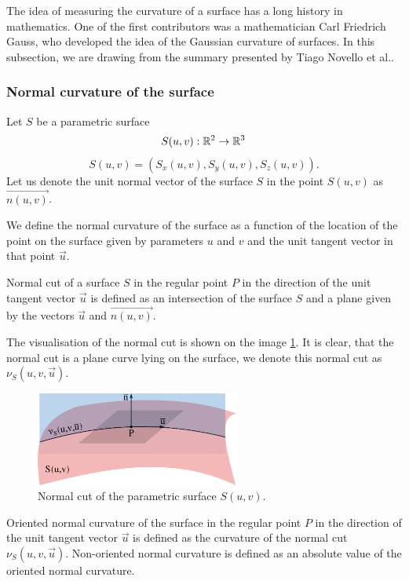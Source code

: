 The idea of measuring the curvature of a surface has a long history in mathematics.
One of the first contributors was a mathematician Carl Friedrich Gauss, who developed
the idea of the Gaussian curvature of surfaces. In this subsection, we are drawing from
the summary presented by Tiago Novello et al.\cite{novello2021differential}.

\subsubsection*{Normal curvature of the surface}

Let $S$ be a parametric surface $$S(u, v): \mathbb{R}^2 \to \mathbb{R}^3$$ $$S(u, v) = (S_x(u,v), S_y(u,v), S_z(u,v)).$$
Let us denote the unit normal vector of the surface $S$ in the point $S(u, v)$ as $\overrightarrow{n(u, v)}$.

We define the normal curvature of the surface as a function of the location of the point
on the surface given by parameters $u$ and $v$ and the unit tangent vector in that point $\overrightarrow{u}$. 

\begin{definition}
Normal cut of a surface $S$ in the regular point $P$ in the direction of the unit tangent vector 
$\overrightarrow{u}$ is defined as an intersection of the surface $S$ and a plane
given by the vectors $\overrightarrow{u}$ and $\overrightarrow{n(u, v)}$. 
\end{definition}

The visualisation of the normal cut is shown on the image \ref{img:14}.
It is clear, that the
normal cut is a plane curve lying on the surface, we denote this normal cut as $\nu_S(u, v, \overrightarrow{u})$.

\begin{figure}
    \centerline{\includegraphics[width=0.6\textwidth]{images/img14}}
    \caption[Normal cut]
    {Normal cut of the parametric surface $S(u,v)$.}
    \label{img:14}
\end{figure}

\begin{definition}
    Oriented normal curvature of the surface in the regular point $P$ in the direction of the unit tangent vector
    $\overrightarrow{u}$ is defined as the curvature of the normal cut $\nu_S(u, v, \overrightarrow{u})$.
    Non-oriented normal curvature is defined as an absolute value of the oriented normal curvature.
\end{definition}

